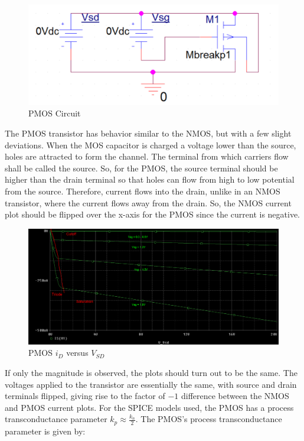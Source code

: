\FloatBarrier

\begin{figure}[h!]
	\centering
	\includegraphics[scale=0.5]{./images/circuit2.PNG}
	\caption{PMOS Circuit}
	\label{fig:circuit2}
\end{figure}

\FloatBarrier

The PMOS transistor has behavior similar to the NMOS, but with a few slight deviations. When the MOS capacitor is charged a voltage lower than the source, holes are attracted to form the channel. The terminal from which carriers flow shall be called the source. So, for the PMOS, the source terminal should be higher than the drain terminal so that holes can flow from high to low potential from the source. Therefore, current flows into the drain, unlike in an NMOS transistor, where the current flows away from the drain. So, the NMOS current plot should be flipped over the x-axis for the PMOS since the current is negative.

\FloatBarrier

\begin{figure}[h!]
	\centering
	\includegraphics[scale=0.25]{./images/circuit2_vsd_sweep.PNG}
	\caption{PMOS $i_{D}$ versus $V_{SD}$}
	\label{fig:circuit2_vsd_sweep}
\end{figure}

\FloatBarrier

If only the magnitude is observed, the plots should turn out to be the same. The voltages applied to the transistor are essentially the same, with source and drain terminals flipped, giving rise to the factor of $-1$ difference between the NMOS and PMOS current plots. For the SPICE models used, the PMOS has a process transconductance parameter $k_p \approx \frac{k_n}{2}$. The PMOS's process transconductance parameter is given by:


